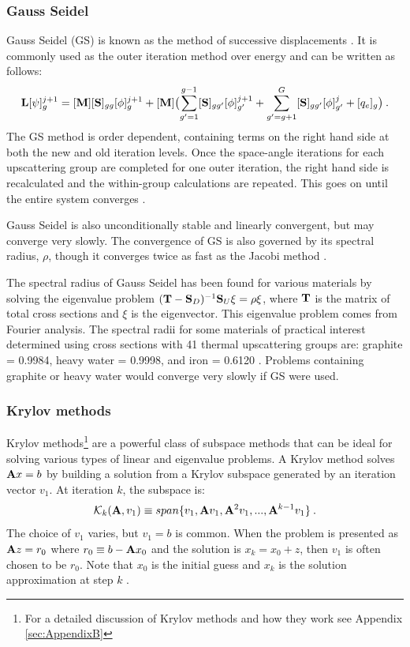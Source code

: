\subsubsection{Gauss Seidel}
Gauss Seidel (GS) is known as the method of successive displacements \cite{LeVeque2007}. It is commonly used as the outer iteration method over energy and can be written as follows:
%
\begin{equation}
  \mathbf{L} [\psi]_{g}^{j+1} = [\mathbf{M}] [\mathbf{S}]_{gg}[\phi]_{g}^{j+1} +   [\mathbf{M}]\bigl(\sum_{g'=1}^{g-1} [\mathbf{S}]_{gg'}[\phi]_{g'}^{j+1} + \sum_{g'=g+1}^{G} [\mathbf{S}]_{gg'}[\phi]_{g'}^{j} + [q_{e}]_{g} \bigr) \label{eq:GaussSeidel} \:. 
\end{equation}
%
The GS method is order dependent, containing terms on the right hand side at both the new and old iteration levels. Once the space-angle iterations for each upscattering group are completed for one outer iteration, the right hand side is recalculated and the within-group calculations are repeated. This goes on until the entire system converges \cite{Evans2009d}. 

Gauss Seidel is also unconditionally stable and linearly convergent, but may converge very slowly. The convergence of GS is also governed by its spectral radius, $\rho$, though it converges twice as fast as the Jacobi method \cite{LeVeque2007}. 

The spectral radius of Gauss Seidel has been found for various materials by solving the eigenvalue problem $(\mathbf{T} - \mathbf{S}_{D})^{-1}\mathbf{S}_{U} \xi = \rho \xi$, where $\mathbf{T}$ is the matrix of total cross sections and $\xi$ is the eigenvector. This eigenvalue problem comes from Fourier analysis. The spectral radii for some materials of practical interest determined using cross sections with 41 thermal upscattering groups are: graphite = 0.9984, heavy water = 0.9998, and iron = 0.6120 \cite{Adams2002}. Problems containing graphite or heavy water would converge very slowly if GS were used.   

\subsubsection{Krylov methods}
Krylov methods\footnote{For a detailed discussion of Krylov methods and how they work see Appendix \ref{sec:AppendixB}} are a powerful class of subspace methods that can be ideal for solving various types of linear and eigenvalue problems. A Krylov method solves $\mathbf{A}x = b$ by building a solution from a Krylov subspace generated by an iteration vector $v_{1}$. At iteration $k$, the subspace is:
%
\begin{equation}
  \mathcal{K}_{k}(\mathbf{A},v_{1}) \equiv span\{v_{1}, \mathbf{A}v_{1}, \mathbf{A}^{2}v_{1}, ..., \mathbf{A}^{k-1}v_{1}\} \:.
  \label{eq:Krylov-subspace}
\end{equation}
%
The choice of $v_{1}$ varies, but $v_{1} = b$ is common. When the problem is presented as $\mathbf{A}z = r_{0}$ where $r_{0} \equiv b - \mathbf{A}x_{0}$ and the solution is $x_{k} = x_{0} + z$, then $v_{1} $ is often chosen to be $r_{0}$. Note that $x_{0}$ is the initial guess and $x_{k}$ is the solution approximation at step $k$  \cite{Ipsen1998}.

